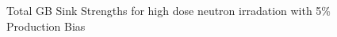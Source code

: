 \documentclass[a4paper]{article}
\begin{document}
      \begin{figure}[h!]  %
        \centering
        \qquad
        \caption{Total GB Sink Strengths for high dose neutron irradation with 5\% Production Bias}
        \label{figure:sink_strengths_neutron_5_1e-3}
      \end{figure}
\end{document}
